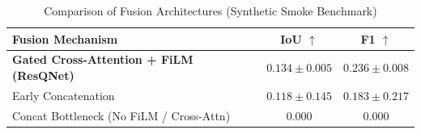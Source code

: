 \begin{table}[h]
\centering
\caption{Comparison of Fusion Architectures (Synthetic Smoke Benchmark)}
\label{tab:fusion}
\begin{tabular}{lcc}
\toprule
Fusion Mechanism & IoU $\uparrow$ & F1 $\uparrow$ \\
\midrule
\textbf{Gated Cross-Attention + FiLM (ResQNet)} & \textbf{$0.134 \pm 0.005$} & \textbf{$0.236 \pm 0.008$} \\
Early Concatenation & $0.118 \pm 0.145$ & $0.183 \pm 0.217$ \\
Concat Bottleneck (No FiLM / Cross-Attn) & $0.000$ & $0.000$ \\
\bottomrule
\end{tabular}
\end{table}